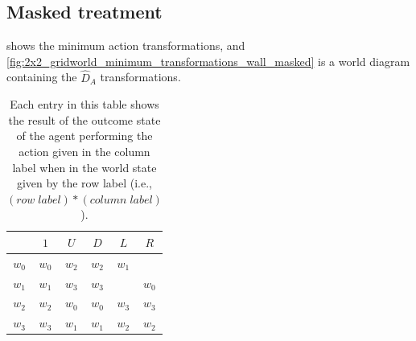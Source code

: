 \subsection{Masked treatment}


 shows the minimum action transformations, and \cref{fig:2x2_gridworld_minimum_transformations_wall_masked} is a world diagram containing the $\hat{D}_{A}$ transformations.

\begin{table}[H]
    \centering
    \begin{tabular}{c|c c c c c}
                &  $1$      & $U$       & $D$       & $L$               & $R$\\
         \hline
        $w_{0}$ & $w_{0}$   & $w_{2}$   & $w_{2}$   & $w_{1}$           & \bm{$\bot$} \\
        $w_{1}$ & $w_{1}$   & $w_{3}$   & $w_{3}$   & \bm{$\bot$}         & $w_{0}$ \\
        $w_{2}$ & $w_{2}$   & $w_{0}$   & $w_{0}$   & $w_{3}$           & $w_{3}$ \\
        $w_{3}$ & $w_{3}$   & $w_{1}$   & $w_{1}$   & $w_{2}$           & $w_{2}$ \\
    \end{tabular}
    \caption{
    Each entry in this table shows the result of the outcome state of the agent performing the action given in the column label when in the world state given by the row label (i.e., $(row \; label) * (column \; label)$).
    }
    \label{tab:2x2_gridworld_minimum_transformations_wall_masked}
\end{table}

